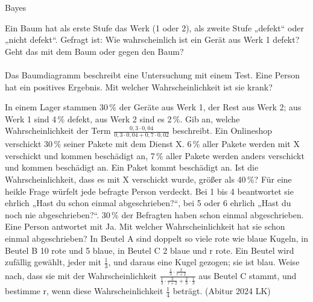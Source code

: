 \setcounter{aufgabe}{9}

\begin{aufgabe}{Bayes}
\begin{teile}
\teil Ein Baum hat als erste Stufe das Werk (1 oder 2), als zweite Stufe „defekt“ oder „nicht defekt“. Gefragt ist: Wie wahrscheinlich ist ein Gerät aus Werk 1 defekt? Geht das mit dem Baum oder gegen den Baum? \\  \\ 
\teil Das Baumdiagramm beschreibt eine Untersuchung mit einem Test. Eine Person hat ein positives Ergebnis. Mit welcher Wahrscheinlichkeit ist sie krank?

\leerfeld
\teil In einem Lager stammen 30\,\% der Geräte aus Werk 1, der Rest aus Werk 2; aus Werk 1 sind 4\,\% defekt, aus Werk 2 sind es 2\,\%. Gib an, welche Wahrscheinlichkeit der Term $\frac{0{,}3 \cdot 0{,}04}{0{,}3 \cdot 0{,}04 + 0{,}7 \cdot 0{,}02}$ beschreibt.
\teil Ein Onlineshop verschickt 30\,\% seiner Pakete mit dem Dienst X. 6\,\% aller Pakete werden mit X verschickt und kommen beschädigt an, 7\,\% aller Pakete werden anders verschickt und kommen beschädigt an. Ein Paket kommt beschädigt an. Ist die Wahrscheinlichkeit, dass es mit X verschickt wurde, größer als 40\,\%?
\teil Für eine heikle Frage würfelt jede befragte Person verdeckt. Bei 1 bis 4 beantwortet sie ehrlich „Hast du schon einmal abgeschrieben?“, bei 5 oder 6 ehrlich „Hast du noch nie abgeschrieben?“. 30\,\% der Befragten haben schon einmal abgeschrieben. Eine Person antwortet mit Ja. Mit welcher Wahrscheinlichkeit hat sie schon einmal abgeschrieben? \leerfeld
\teil In Beutel A sind doppelt so viele rote wie blaue Kugeln, in Beutel B 10 rote und 5 blaue, in Beutel C 2 blaue und r rote. Ein Beutel wird zufällig gewählt, jeder mit $\frac{1}{3}$, und daraus eine Kugel gezogen; sie ist blau. Weise nach, dass sie mit der Wahrscheinlichkeit $\frac{\frac{1}{3} \cdot \frac{2}{r+2}}{\frac{1}{3} \cdot \frac{2}{r+2} + \frac{2}{3} \cdot \frac{1}{3}}$ aus Beutel C stammt, und bestimme r, wenn diese Wahrscheinlichkeit $\frac{1}{4}$ beträgt. \hfill (Abitur 2024 LK)
\end{teile}
\end{aufgabe}

